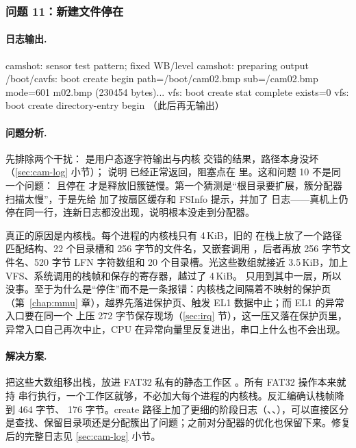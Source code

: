 \subsubsection{问题 11：新建文件停在 }

\paragraph{日志输出.}
\begin{txtcode}
camshot: sensor test pattern; fixed WB/level
camshot: preparing output /boot/cavfs: boot create begin path=/boot/cam02.bmp sub=/cam02.bmp mode=601
m02.bmp (230454 bytes)...
vfs: boot create stat complete exists=0
vfs: boot create directory-entry begin
（此后再无输出）
\end{txtcode}

\paragraph{问题分析.} 先排除两个干扰： 是用户态逐字符输出与内核  交错的结果，路径本身没坏（\ref{sec:cam-log} 小节）； 说明  已经正常返回，阻塞点在  里。这和问题 10 不是同一个问题： 且停在  才是释放旧簇链慢。第一个猜测是“根目录要扩展，簇分配器扫描太慢”，于是先给  加了按扇区缓存和 FSInfo 提示，并加了  日志——真机上仍停在同一行，连新日志都没出现，说明根本没走到分配器。

真正的原因是内核栈。每个进程的内核栈只有 4\,KiB，旧的  在栈上放了一个路径匹配结构、22 个目录槽和 256 字节的文件名，又嵌套调用 ，后者再放 256 字节文件名、520 字节 LFN 字符数组和 20 个目录槽。光这些数组就接近 3.5\,KiB，加上 VFS、系统调用的栈帧和保存的寄存器，越过了 4\,KiB。 只用到其中一层，所以没事。至于为什么是“停住”而不是一条报错：内核栈之间隔着不映射的保护页（第~\ref{chap:mmu} 章），越界先落进保护页、触发 EL1 数据中止；而 EL1 的异常入口要在同一个  上压 272 字节保存现场（\ref{sec:irq} 节），这一压又落在保护页里，异常入口自己再次中止，CPU 在异常向量里反复进出，串口上什么也不会出现。

\paragraph{解决方案.} 把这些大数组移出栈，放进 FAT32 私有的静态工作区 。所有 FAT32 操作本来就持  串行执行，一个工作区就够，不必加大每个进程的内核栈。反汇编确认栈帧降到  464 字节、 176 字节。create 路径上加了更细的阶段日志（、、），可以直接区分是查找、保留目录项还是分配簇出了问题；之前对分配器的优化也保留下来。修复后的完整日志见 \ref{sec:cam-log} 小节。

